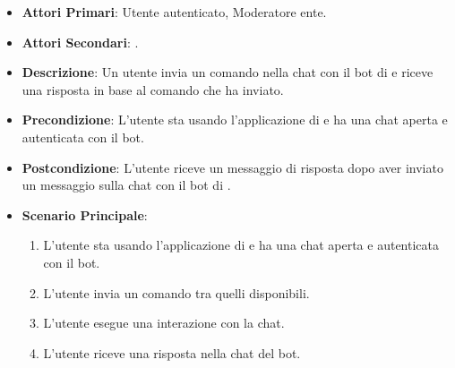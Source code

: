 	\begin{itemize}
		\item \textbf{Attori Primari}: Utente autenticato, Moderatore ente.
		\item \textbf{Attori Secondari}: .
		\item \textbf{Descrizione}: Un utente invia un comando nella chat con il bot di  e riceve una risposta in base al comando che ha inviato. 
		\item \textbf{Precondizione}: L'utente sta usando l'applicazione di  e ha una chat aperta e autenticata con il bot.
		\item \textbf{Postcondizione}: L'utente riceve un messaggio di risposta dopo aver inviato un messaggio sulla chat con il bot di .
		\item \textbf{Scenario Principale}:
		\begin{enumerate}
			\item L'utente sta usando l'applicazione di  e ha una chat aperta e autenticata con il bot. 
			\item L'utente invia un comando tra quelli disponibili.
			\item L'utente esegue una interazione con la chat.
			\item L'utente riceve una risposta nella chat del bot.
		\end{enumerate}
	\end{itemize}